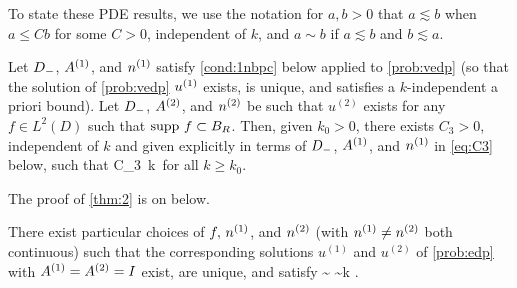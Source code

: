 To state these PDE results, we use the notation for $a,b>0$ that $a\lesssim b$ when $a\leq C b$ for some $C>0$, independent of $k$, and $a\sim b$ if $a\lesssim b$ and $b\lesssim a$.



\begin{theorem}\label{thm:2}
Let $D_{-}$, ${A}^{(1)}$, and ${n}^{(1)}$ satisfy \cref{cond:1nbpc} below applied to \cref{prob:vedp} (so that the solution of \cref{prob:vedp} ${u}^{(1)}$ exists, is unique, and satisfies a $k$-independent a priori bound). Let $D_{-}$, ${A}^{(2)}$, and ${n}^{(2)}$ be such that $u^{(2)}$ exists
for any $f\in L^2(D)$ such that $\operatorname{supp} \, f \subset B_{R}$. 
Then, given $k_0>0$, there exists $C_3>0$, independent of $k$ and given explicitly in terms of $D_{-}$, ${A}^{(1)}$, and ${n}^{(1)}$ in \cref{eq:C3} below, such that
\beq\label{eq:PDEbound}
\leq C_3 \,k\, \max\set{\NLiDop{\Aso-\Ast}\,,\, \NLiDRR{\nso-\nst}}
\eeq
for all $k\geq k_0$. 
\end{theorem}

The proof of \cref{thm:2} is on  below.

\ble[Sharpness of the bound \cref{eq:PDEbound} when $\Aso = \Ast= I$]\label{lem:sharp}
There exist particular choices of  $f, \,{n}^{(1)}$, and ${n}^{(2)}$ (with ${n}^{(1)}\neq {n}^{(2)}$ both continuous) such that 
the corresponding solutions $u^{(1)}$ and $u^{(2)}$ of \cref{prob:edp} with $\Aso = \Ast= I$ exist, are unique, and satisfy
\beq\label{eq:sharp1}
\sim 
{}\sim k \NLiDRR{\nso-\nst}.
\eeq
\ele

